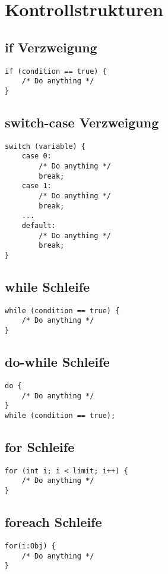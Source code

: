 



\section{Kontrollstrukturen}

\subsection{if Verzweigung}
\begin{lstlisting}[caption=if Verzweigung]
if (condition == true) {
    /* Do anything */
}
\end{lstlisting}

\subsection{switch-case Verzweigung}
\begin{lstlisting}[caption=switch-case Verzweigung]
switch (variable) {
    case 0: 
        /* Do anything */
        break;
    case 1: 
        /* Do anything */
        break;
    ...
    default: 
        /* Do anything */
        break;
}
\end{lstlisting}

\subsection{while Schleife}
\begin{lstlisting}[caption=while Schleife]
while (condition == true) {
    /* Do anything */
}
\end{lstlisting}

\subsection{do-while Schleife}
\begin{lstlisting}[caption=do-while]
do {
    /* Do anything */
}
while (condition == true);
\end{lstlisting}

\subsection{for Schleife}
\begin{lstlisting}[caption=for Schleife]
for (int i; i < limit; i++) {
    /* Do anything */
}
\end{lstlisting}

\subsection{foreach Schleife}
\begin{lstlisting}[caption=foreach Schleife]
for(i:Obj) {
    /* Do anything */
}
\end{lstlisting}

